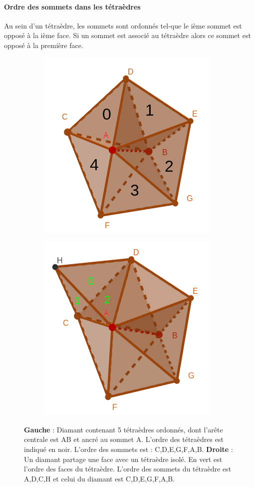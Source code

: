 \paragraph{Ordre des sommets dans les tétraèdres}
Au sein d'un tétraèdre, les sommets sont ordonnés tel-que le ième sommet est opposé à la ième face. Si un sommet est associé au tétraèdre alors ce sommet est opposé à la première face.
\begin{figure}[H]
\centering
\begin{subfigure}{.5\textwidth}
  \centering
  \includegraphics[scale=0.34]{Images/tetra_ordonnee}
  \caption{}
  \label{fig:tetra_ordonnee}
\end{subfigure}%
\begin{subfigure}{.5\textwidth}
  \centering
  \includegraphics[scale=0.36]{Images/permutation_tetra_diamant}
  \caption{}
  \label{fig:permutation_tetra_diamant}
\end{subfigure}
\caption{\textbf{Gauche} : Diamant contenant 5 tétraèdres ordonnés, dont l'arête centrale est AB et ancré au sommet A. L'ordre des tétraèdres est indiqué en noir. L'ordre des sommets est : C,D,E,G,F,A,B. \textbf{Droite} : Un diamant partage une face avec un tétraèdre isolé. En vert est l'ordre des faces du tétraèdre. L'ordre des sommets du tétraèdre est A,D,C,H et celui du diamant est C,D,E,G,F,A,B.}
\end{figure}
